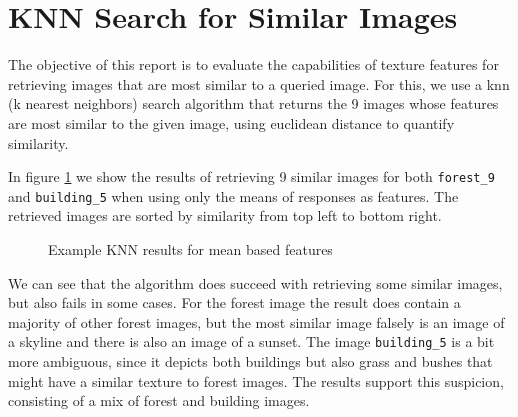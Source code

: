 \section{KNN Search for Similar Images}

The objective of this report is to evaluate the capabilities of texture features for retrieving images that are most similar to a queried image. For this, we use a knn (k nearest neighbors) search algorithm that returns the 9 images whose features are most similar to the given image, using euclidean distance to quantify similarity. 

In figure \ref{fig:100000} we show the results of retrieving 9 similar images for both \texttt{forest\_9} and \texttt{building\_5} when using only the means of responses as features. The retrieved images are sorted by similarity from top left to bottom right. 

\begin{figure}[!hbt]
\centering
{}
\caption{Example KNN results for mean based features}
\label{fig:100000}
\end{figure}

We can see that the algorithm does succeed with retrieving some similar images, but also fails in some cases. For the forest image the result does contain a majority of other forest images, but the most similar image falsely is an image of a skyline and there is also an image of a sunset. The image \texttt{building\_5} is a bit more ambiguous, since it depicts both buildings but also grass and bushes that might have a similar texture to forest images. The results support this suspicion, consisting of a mix of forest and building images.

